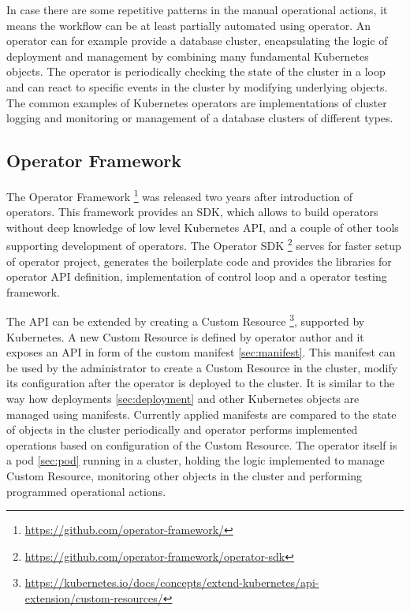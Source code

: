 \documentclass[
  digital, %
  twoside, %
  table,   %
  lof,     %
  lot,     %
]{fithesis3}
\begin{document}
In case there are some repetitive patterns in the manual operational actions, it means the workflow can be at least partially automated using operator. An operator can for example provide a database cluster, encapsulating the logic of deployment and management by combining many fundamental Kubernetes objects. The operator is periodically checking the state of the cluster in a loop and can react to specific events in the cluster by modifying underlying objects. The common examples of Kubernetes operators are implementations of cluster logging and monitoring or management of a database clusters of different types.

\subsection{Operator Framework} \label{sec:operator_framework}
The Operator Framework \footnote{\url{https://github.com/operator-framework/}} was released two years after introduction of operators. This framework provides an SDK, which allows to build operators without deep knowledge of low level Kubernetes API, and a couple of other tools supporting development of operators. The Operator SDK \footnote{\url{https://github.com/operator-framework/operator-sdk}} serves for faster setup of operator project, generates the boilerplate code and provides the libraries for operator API definition, implementation of control loop and a operator testing framework.

The API can be extended by creating a Custom Resource \footnote{\url{https://kubernetes.io/docs/concepts/extend-kubernetes/api-extension/custom-resources/}}, supported by Kubernetes. A new Custom Resource is defined by operator author and it exposes an API in form of the custom manifest \ref{sec:manifest}. This manifest can be used by the administrator to create a Custom Resource in the cluster, modify its configuration after the operator is deployed to the cluster. It is similar to the way how deployments \ref{sec:deployment} and other Kubernetes objects are managed using manifests. Currently applied manifests are compared to the state of objects in the cluster periodically and operator performs implemented operations based on configuration of the Custom Resource. The operator itself is a pod \ref{sec:pod} running in a cluster, holding the logic implemented to manage Custom Resource, monitoring other objects in the cluster and performing programmed operational actions.
\end{document}
